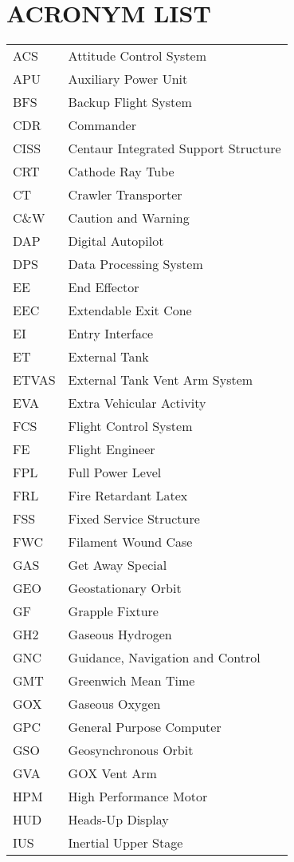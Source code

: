 \documentclass[Space_Shuttle_Vessel_Manual.tex]{subfiles}
\begin{document}
\section{ACRONYM LIST}
\label{sec:acronym-list}
\noindent
\begin{longtable}{l l }
ACS & Attitude Control System\\
APU & Auxiliary Power Unit\\
BFS & Backup Flight System\\
CDR & Commander\\
CISS & Centaur Integrated Support Structure\\
CRT & Cathode Ray Tube\\
CT & Crawler Transporter\\
C\&W & Caution and Warning\\
DAP & Digital Autopilot\\
DPS & Data Processing System\\
EE & End Effector\\
EEC & Extendable Exit Cone\\
EI & Entry Interface\\
ET & External Tank\\
ETVAS & External Tank Vent Arm System\\
EVA & Extra Vehicular Activity\\
FCS & Flight Control System\\
FE & Flight Engineer\\
FPL & Full Power Level\\
FRL & Fire Retardant Latex\\
FSS & Fixed Service Structure\\
FWC & Filament Wound Case\\
GAS & Get Away Special\\
GEO & Geostationary Orbit\\
GF & Grapple Fixture\\
GH2 & Gaseous Hydrogen\\
GNC & Guidance, Navigation and Control\\
GMT & Greenwich Mean Time\\
GOX & Gaseous Oxygen\\
GPC & General Purpose Computer\\
GSO & Geosynchronous Orbit\\
GVA & GOX Vent Arm\\
HPM & High Performance Motor\\
HUD & Heads-Up Display\\
IUS & Inertial Upper Stage\\

\end{longtable}
\end{document}
